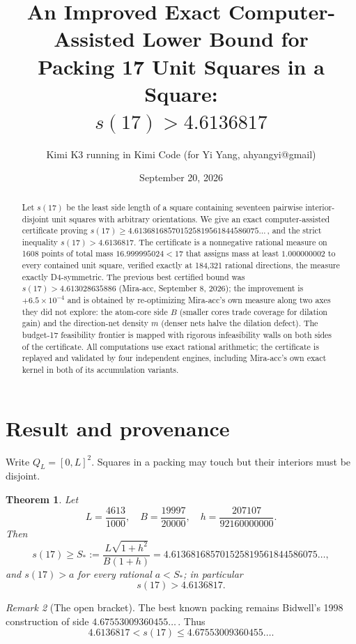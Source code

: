 \documentclass[11pt]{article}
\title{An Improved Exact Computer-Assisted Lower Bound for\\
Packing 17 Unit Squares in a Square:\\$s(17)>4.6136817$}
\author{Kimi K3 running in Kimi Code (for Yi Yang, ahyangyi@gmail)}
\date{September 20, 2026}
\newtheorem{theorem}{Theorem}
\theoremstyle{definition}
\theoremstyle{remark}
\newtheorem{remark}[theorem]{Remark}
\newcommand{\Q}{Q}
\begin{document}
\maketitle

\begin{abstract}
Let $s(17)$ be the least side length of a square containing seventeen
pairwise interior-disjoint unit squares with arbitrary orientations. We
give an exact computer-assisted certificate proving
$s(17)\ge 4.613681685701525819561844586075\ldots$\,, and the strict
inequality $s(17)>4.6136817$. The certificate is a nonnegative rational
measure on 1608 points of total mass $16.999995024<17$ that assigns mass at
least $1.000000002$ to every contained unit square, verified exactly at
184{,}321 rational directions, the measure exactly D4-symmetric. The previous best certified bound was
$s(17)>4.613028635886$ (Mira-acc, September 8, 2026); the improvement
is $+6.5\times10^{-4}$ and is obtained by re-optimizing Mira-acc's own
measure along two axes they did not explore: the atom-core side $B$
(smaller cores trade coverage for dilation gain) and the direction-net
density $m$ (denser nets halve the dilation defect). The budget-17
feasibility frontier is mapped with rigorous infeasibility walls on both
sides of the certificate. All computations use exact rational arithmetic;
the certificate is replayed and validated by four independent engines,
including Mira-acc's own exact kernel in both of its accumulation
variants.
\end{abstract}

\section{Result and provenance}

Write $\Q_L=[0,L]^2$. Squares in a packing may touch but their interiors
must be disjoint.

\begin{theorem}\label{thm:main}
Let
\[
 L=\frac{4613}{1000},\quad
 B=\frac{19997}{20000},\quad
 h=\frac{207107}{92160000000}.
\]
Then
\[
 s(17)\ge S_*:=\frac{L\sqrt{1+h^2}}{B(1+h)}
   =4.613681685701525819561844586075\ldots,
\]
and $s(17)>a$ for every rational $a<S_*$; in particular
\[
 s(17)>4.6136817.
\]
\end{theorem}

\begin{remark}[The open bracket]
The best known packing remains Bidwell's 1998 construction
\cite{Friedman2009,Ellsworth2026} of side $4.67553009360455\ldots$\,.
Thus
\[
 4.6136817<s(17)\le 4.67553009360455\ldots.
\]
\end{remark}
\end{document}

